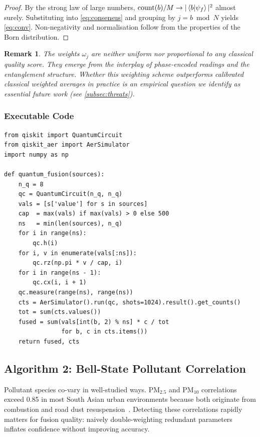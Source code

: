 \documentclass[conference]{IEEEtran}
\newtheorem{remark}{Remark}
\begin{document}
\begin{proof}
By the strong law of large numbers,
$\mathrm{count}(b)/M \to |\braket{b|\psi_f}|^2$ almost surely.
Substituting into \eqref{eq:consensus} and grouping by $j = b \bmod N$
yields \eqref{eq:conv}.
Non-negativity and normalisation follow from the properties of the Born
distribution.
\end{proof}

\begin{remark}
The weights $\omega_j$ are neither uniform nor proportional to any
classical quality score.
They emerge from the interplay of phase-encoded readings and the
entanglement structure.
Whether this weighting scheme outperforms calibrated classical
weighted averages in practice is an empirical question we identify as
essential future work (see \cref{subsec:threats}).
\end{remark}

\subsubsection{Executable Code}

\begin{lstlisting}[caption={Superposition fusion, Qiskit 0.45.1.},
  label=lst:fusion, float=t]
from qiskit import QuantumCircuit
from qiskit_aer import AerSimulator
import numpy as np

def quantum_fusion(sources):
    n_q = 8
    qc = QuantumCircuit(n_q, n_q)
    vals = [s['value'] for s in sources]
    cap  = max(vals) if max(vals) > 0 else 500
    ns   = min(len(sources), n_q)
    for i in range(ns):
        qc.h(i)
    for i, v in enumerate(vals[:ns]):
        qc.rz(np.pi * v / cap, i)
    for i in range(ns - 1):
        qc.cx(i, i + 1)
    qc.measure(range(ns), range(ns))
    cts = AerSimulator().run(qc, shots=1024).result().get_counts()
    tot = sum(cts.values())
    fused = sum(vals[int(b, 2) % ns] * c / tot
                for b, c in cts.items())
    return fused, cts
\end{lstlisting}


\subsection{Algorithm 2: Bell-State Pollutant Correlation}\label{subsec:bell_formal}

Pollutant species co-vary in well-studied ways.
PM$_{2.5}$ and PM$_{10}$ correlations exceed 0.85 in most South Asian
urban environments because both originate from combustion and road
dust resuspension~\cite{pant2013estimation}.
Detecting these correlations rapidly matters for fusion quality: naively
double-weighting redundant parameters inflates confidence without
improving accuracy.
\end{document}
